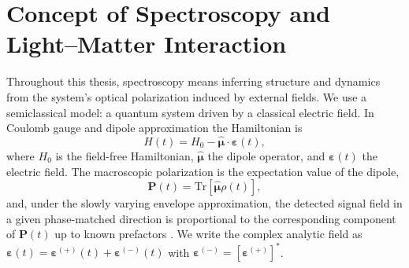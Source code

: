 \section{Concept of Spectroscopy and Light--Matter Interaction}
\label{copy:sec:concept_light_matter}
\noindent
Throughout this thesis, spectroscopy means inferring structure and dynamics from the system’s optical polarization induced by external fields. We use a semiclassical model: a quantum system driven by a classical electric field. In Coulomb gauge and dipole approximation the Hamiltonian is
\begin{equation}
    H(t)=H_0 - \hat{\boldsymbol{\mu}}\cdot \boldsymbol{\varepsilon}(t),
    \label{copy:eq:H_dipole}
\end{equation}
where $H_0$ is the field-free Hamiltonian, $\hat{\boldsymbol{\mu}}$ the dipole operator, and $\boldsymbol{\varepsilon}(t)$ the electric field. The macroscopic polarization is the expectation value of the dipole,
\begin{equation}
    \boldsymbol{P}(t)=\mathrm{Tr}\!\left[\hat{\boldsymbol{\mu}}\rho(t)\right],
    \label{copy:eq:P_def}
\end{equation}
and, under the slowly varying envelope approximation, the detected signal field in a given phase-matched direction is proportional to the corresponding component of $\boldsymbol{P}(t)$ up to known prefactors \cite{mukamel1995principlesnonlinearoptical, boyd2008chapter6nonlinear}. We write the complex analytic field as $\boldsymbol{\varepsilon}(t)=\boldsymbol{\varepsilon}^{(+)}(t)+\boldsymbol{\varepsilon}^{(-)}(t)$ with $\boldsymbol{\varepsilon}^{(-)}=[\boldsymbol{\varepsilon}^{(+)}]^*$.


